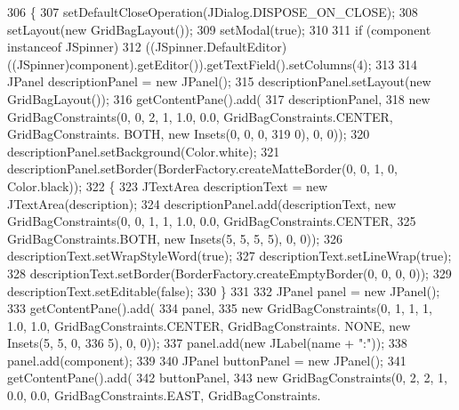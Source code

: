 \begin{DoxyCode}
306                                                                                   \{
307             setDefaultCloseOperation(JDialog.DISPOSE\_ON\_CLOSE);
308             setLayout(\textcolor{keyword}{new} GridBagLayout());
309             setModal(\textcolor{keyword}{true});
310 
311             \textcolor{keywordflow}{if} (component instanceof JSpinner)
312                 ((JSpinner.DefaultEditor)((JSpinner)component).getEditor()).getTextField().setColumns(4);
313 
314             JPanel descriptionPanel = \textcolor{keyword}{new} JPanel();
315             descriptionPanel.setLayout(\textcolor{keyword}{new} GridBagLayout());
316             getContentPane().add(
317                 descriptionPanel,
318                 \textcolor{keyword}{new} GridBagConstraints(0, 0, 2, 1, 1.0, 0.0, GridBagConstraints.CENTER, GridBagConstraints.
      BOTH, \textcolor{keyword}{new} Insets(0, 0, 0,
319                     0), 0, 0));
320             descriptionPanel.setBackground(Color.white);
321             descriptionPanel.setBorder(BorderFactory.createMatteBorder(0, 0, 1, 0, Color.black));
322             \{
323                 JTextArea descriptionText = \textcolor{keyword}{new} JTextArea(description);
324                 descriptionPanel.add(descriptionText, \textcolor{keyword}{new} GridBagConstraints(0, 0, 1, 1, 1.0, 0.0, 
      GridBagConstraints.CENTER,
325                     GridBagConstraints.BOTH, \textcolor{keyword}{new} Insets(5, 5, 5, 5), 0, 0));
326                 descriptionText.setWrapStyleWord(\textcolor{keyword}{true});
327                 descriptionText.setLineWrap(\textcolor{keyword}{true});
328                 descriptionText.setBorder(BorderFactory.createEmptyBorder(0, 0, 0, 0));
329                 descriptionText.setEditable(\textcolor{keyword}{false});
330             \}
331 
332             JPanel panel = \textcolor{keyword}{new} JPanel();
333             getContentPane().add(
334                 panel,
335                 \textcolor{keyword}{new} GridBagConstraints(0, 1, 1, 1, 1.0, 1.0, GridBagConstraints.CENTER, GridBagConstraints.
      NONE, \textcolor{keyword}{new} Insets(5, 5, 0,
336                     5), 0, 0));
337             panel.add(\textcolor{keyword}{new} JLabel(name + \textcolor{stringliteral}{":"}));
338             panel.add(component);
339 
340             JPanel buttonPanel = \textcolor{keyword}{new} JPanel();
341             getContentPane().add(
342                 buttonPanel,
343                 \textcolor{keyword}{new} GridBagConstraints(0, 2, 2, 1, 0.0, 0.0, GridBagConstraints.EAST, GridBagConstraints.

\end{DoxyCode}
